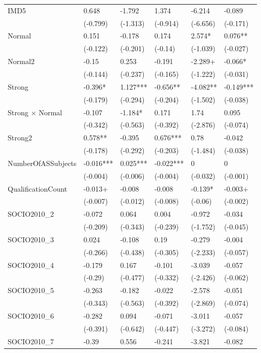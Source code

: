 \begin{longtable}{llllll}
IMD5 & 0.648 & -1.792 & 1.374 & -6.214 & -0.089 \\
 & (-0.799) & (-1.313) & (-0.914) & (-6.656) & (-0.171) \\
Normal & 0.151 & -0.178 & 0.174 & 2.574* & 0.076** \\
 & (-0.122) & (-0.201) & (-0.14) & (-1.039) & (-0.027) \\
Normal2 & -0.15 & 0.253 & -0.191 & -2.289+ & -0.066* \\
 & (-0.144) & (-0.237) & (-0.165) & (-1.222) & (-0.031) \\
Strong & -0.396* & 1.127*** & -0.656** & -4.082** & -0.149*** \\
 & (-0.179) & (-0.294) & (-0.204) & (-1.502) & (-0.038) \\
Strong × Normal & -0.107 & -1.184* & 0.171 & 1.74 & 0.095 \\
 & (-0.342) & (-0.563) & (-0.392) & (-2.876) & (-0.074) \\
Strong2 & 0.578** & -0.395 & 0.676*** & 0.78 & -0.042 \\
 & (-0.178) & (-0.292) & (-0.203) & (-1.484) & (-0.038) \\
NumberOfASSubjects & -0.016*** & 0.025*** & -0.022*** & 0 & 0 \\
 & (-0.004) & (-0.006) & (-0.004) & (-0.032) & (-0.001) \\
QualificationCount & -0.013+ & -0.008 & -0.008 & -0.139* & -0.003+ \\
 & (-0.007) & (-0.012) & (-0.008) & (-0.06) & (-0.002) \\
SOCIO2010\_2 & -0.072 & 0.064 & 0.004 & -0.972 & -0.034 \\
 & (-0.209) & (-0.343) & (-0.239) & (-1.752) & (-0.045) \\
SOCIO2010\_3 & 0.024 & -0.108 & 0.19 & -0.279 & -0.004 \\
 & (-0.266) & (-0.438) & (-0.305) & (-2.233) & (-0.057) \\
SOCIO2010\_4 & -0.179 & 0.167 & -0.101 & -3.039 & -0.057 \\
 & (-0.29) & (-0.477) & (-0.332) & (-2.426) & (-0.062) \\
SOCIO2010\_5 & -0.263 & -0.182 & -0.022 & -2.578 & -0.051 \\
 & (-0.343) & (-0.563) & (-0.392) & (-2.869) & (-0.074) \\
SOCIO2010\_6 & -0.282 & 0.094 & -0.071 & -3.011 & -0.057 \\
 & (-0.391) & (-0.642) & (-0.447) & (-3.272) & (-0.084) \\
SOCIO2010\_7 & -0.39 & 0.556 & -0.241 & -3.821 & -0.082 \\

\end{longtable}

